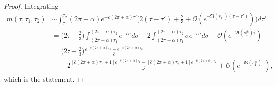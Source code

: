\documentclass[reqno]{amsart}
\theoremstyle{definition} \newtheorem{definition}{Definition}[section]
\theoremstyle{definition} \newtheorem{remark}[definition]{Remark}
\theoremstyle{plain} \newtheorem{lemma}[definition]{Lemma}
\theoremstyle{plain} \newtheorem{proposition}[definition]{Proposition}
\theoremstyle{plain} \newtheorem{theorem}[definition]{Theorem}
\theoremstyle{plain} \newtheorem{corollary}[definition]{Corollary}
\theoremstyle{definition} \newtheorem{example}[definition]{Example}
\theoremstyle{plain} \newtheorem{claim}[clai]{Claim}
\theoremstyle{definition} \newtheorem{assumption}[definition]{Assumption}
\theoremstyle{definition} \newtheorem{observation}[definition]{Observation}
\newcommand{\1}{\mathbbm 1}
\numberwithin{equation}{section} %
\theoremstyle{plain} \newtheorem*{theorem*}{Theorem}
\theoremstyle{plain} \newtheorem{mthm}[maintheorem]{Main Theorem}
\theoremstyle{plain} \newtheorem*{mthm*}{Main Theorem}
\theoremstyle{plain} \newtheorem*{conjecture*}{Conjecture}
\theoremstyle{plain} \newtheorem{conjecture}[definition]{Conjecture}
\theoremstyle{plain} \newtheorem*{problem*}{Problem}
\begin{document}
\begin{proof}
Integrating
\begin{align*}
m(\tau,\tau_1,\tau_2) &\sim \int_{\tau_1}^{\tau_2} (2\pi + \bar \alpha) e^{-\bar c (2\pi + \bar \alpha) \tau'} \bigg( 2 (\tau - \tau') + \frac{2}{3} + \mathcal O(e^{- \Re(s_1^\pm) (\tau - \tau')}) \bigg) d\tau' \\
&= \bigg( 2 \tau + \frac{2}{3} \bigg) \int_{(2\pi + \bar \alpha) \tau_1}^{(2\pi + \bar \alpha) \tau_2} e^{-\bar c \sigma} d\sigma - 2 \int_{(2\pi + \bar \alpha) \tau_1}^{(2\pi + \bar \alpha) \tau_2} \sigma e^{-\bar c \sigma} d\sigma + \mathcal O(e^{- \Re(s_1^\pm) \tau}) \\
&= \bigg( 2 \tau + \frac{2}{3} \bigg) \frac{e^{-\bar s(2\pi + \bar \alpha) \tau_1} - e^{-\bar c(2\pi + \bar \alpha) \tau_2}}{\bar c} \\
& \quad - 2 \frac{[\bar c(2\pi + \alpha) \tau_1 + 1] e^{-\bar s(2\pi + \bar \alpha) \tau_1} - [\bar c(2\pi + \alpha) \tau_2 + 1] e^{-\bar c(2\pi + \bar \alpha) \tau_2}}{\bar c^2} + \mathcal O(e^{- \Re(s_1^\pm) \tau}),
\end{align*}
which is the statement.
\end{proof}
\end{document}

